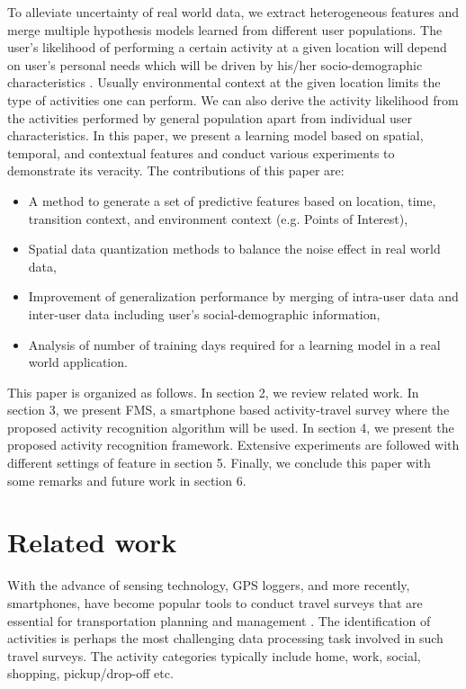 \documentclass{sig-alternate}
\begin{document}
To alleviate uncertainty of real world data, we extract heterogeneous features and merge multiple hypothesis models learned from different user populations. The user's likelihood of performing a certain activity at a given location will depend on user's personal needs which will be driven by his/her socio-demographic characteristics \cite{Kwan1999Gender}. Usually environmental context at the given location limits the type of activities
one can perform. We can also derive the activity likelihood from the activities performed by general population apart from individual user characteristics. In this paper, we present a learning model based on spatial, temporal, and contextual features and conduct various experiments to demonstrate its veracity.
The contributions of this paper are:
\begin{itemize}
\item A method to generate a set of predictive features based on location, time, transition context, and environment context (e.g. Points of Interest),
\item Spatial data quantization methods to balance the noise effect in real world data,
\item Improvement of generalization performance by merging of intra-user data and inter-user data including user's social-demographic information,
\item Analysis of number of training days required for a learning model in a real world application.
\end{itemize}


 This paper is organized as follows. In section 2, we review related work. In section 3, we present FMS, a smartphone based activity-travel survey where the proposed activity recognition algorithm will be used. In section 4, we present the proposed activity recognition framework. Extensive experiments are followed with different settings of feature in section 5. Finally, we conclude this paper with some remarks and future work in section 6. \\




\section{Related work}
With the advance of sensing technology, GPS loggers, and more recently, smartphones, have become popular tools to conduct travel surveys that are essential for transportation planning and management \cite{Bohte2009, Cottrill2013FMS}. The identification of activities is perhaps the most challenging data processing task involved in such travel surveys. The activity categories typically include home, work, social, shopping, pickup/drop-off etc.
\end{document}
